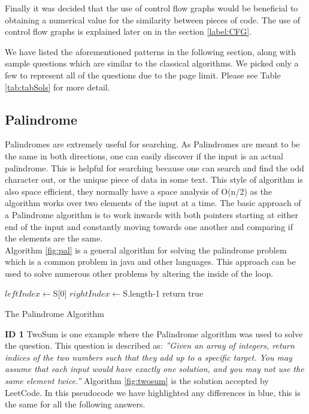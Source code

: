 \documentclass[10pt,twocolumn]{IEEEtran}
\begin{document}
\par Finally it was decided that the use of control flow graphs would be beneficial to obtaining a numerical value for the similarity between pieces of code. The use of control flow graphs is explained later on in the section \ref{label:CFG}.
\par We have listed the aforementioned patterns in the following section, along with sample questions which are similar to the classical algorithms. We picked only a few to represent all of the questions due to the page limit. Please see Table \ref{tab:tabSols} for more detail.
\subsection{Palindrome}
Palindromes are extremely useful for searching. As Palindromes are meant to be the same in both directions, one can easily discover if the input is an actual palindrome. This is helpful for searching because one can search and find the odd character out, or the unique piece of data in some text. This style of algorithm is also space efficient, they normally have a space analysis of O(n/2) as the algorithm works over two elements of the input at a time. The basic approach of a Palindrome algorithm is to work inwards with both pointers starting at either end of the input and constantly moving towards one another and comparing if the elements are the same.\\  
Algorithm \ref{fig:pal} is a general algorithm for solving the palindrome problem which is a common problem in java and other languages. This approach can be used to solve numerous other problems by altering the inside of the loop.
\IncMargin{1em}
\begin{algorithm}
	\SetAlgoLined
	$leftIndex  \longleftarrow $S[0]\;
	$rightIndex \longleftarrow $S.length-1\;
return true\;
\caption{The Palindrome Algorithm}
\label{fig:pal}
\end{algorithm}\DecMargin{1em}
 \textbf{ID 1} TwoSum is one example where the Palindrome algorithm was used to solve the question. This question is described as: \textit{''Given an array of integers, return indices of the two numbers such that they add up to a specific target. You may assume that each input would have exactly one solution, and you may not use the same element twice.''} Algorithm \ref{fig:twosum} is the solution accepted by LeetCode. In this pseudocode we have highlighted any differences in blue, this is the same for all the following answers.
\end{document}
